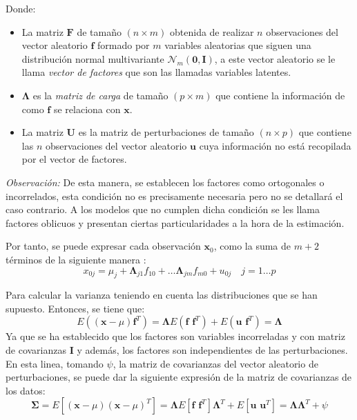 \noindent Donde:
\begin{itemize}

\item La matriz $\textbf{F}$ de tamaño $(n\times m)$ obtenida de realizar $n$ observaciones del vector aleatorio $\textbf{f}$ formado por $m$ variables aleatorias que siguen una distribución normal multivariante $\mathcal{N}_m(\mathbf{0},\textbf{I})$, a este vector aleatorio se le llama \emph{vector de factores} que son las llamadas variables latentes.  
\item $\mathbf{\Lambda}$ es la \emph{matriz de carga} de tamaño $(p\times m)$ que contiene la información de como $\textbf{f}$ se relaciona con $\textbf{x}$.
\item La matriz $\textbf{U}$ es la matriz de perturbaciones de tamaño $(n\times p )$ que contiene las $n$ observaciones del vector aleatorio $\textbf{u}$ cuya información no está recopilada por el vector de factores. 
\end{itemize}

\noindent \emph{Observación: }De esta manera, se establecen los factores como ortogonales o incorrelados, esta condición no es precisamente necesaria pero no se detallará el caso contrario. A los modelos que no cumplen dicha condición se les llama factores oblicuos y presentan ciertas particularidades a la hora de la estimación. 

\noindent Por tanto, se puede expresar cada observación $\textbf{x}_0$, como la suma de $m+2$ términos de la siguiente manera :
\begin{equation}
x_{0j}=\mu_j+\mathbf{\Lambda}_{j1}f_{10}+\ldots\mathbf{\Lambda}_{jm}f_{m0}+u_{0j}\quad j=1\ldots p
\end{equation}

\noindent Para calcular la varianza teniendo en cuenta las distribuciones que se han supuesto. Entonces, se tiene que:
\begin{equation}
E((\textbf{x}-\mu)\textbf{f}^T)=\mathbf{\Lambda} E(\textbf{f }\textbf{f}^T)+E(\textbf{u f}^T)=\mathbf{\Lambda}
\end{equation}
\noindent Ya que se ha establecido que los factores son variables incorreladas y con matriz de covarianzas \textbf{I} y además, los factores son independientes de las perturbaciones. En esta linea, tomando $\psi$, la matriz de covarianzas del vector aleatorio de perturbaciones, se puede dar la siguiente expresión de la matriz de covarianzas de los datos:
\begin{equation}
\mathbf{\Sigma}=E[(\textbf{x}-\mu)(\textbf{x}-\mu)^T]=\mathbf{\Lambda} E[\textbf{f f}^T]\mathbf{\Lambda}^T+E[\textbf{u u}^T] =\mathbf{\Lambda}\mathbf{\Lambda}^T+\psi
\end{equation}

